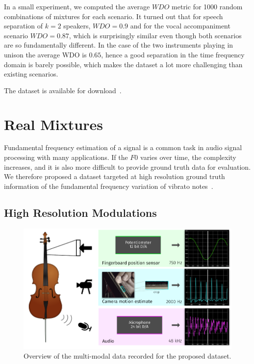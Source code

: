 In a small experiment, we computed the average \(WDO\) metric for 1000 random combinations of mixtures for each scenario.
It turned out that for speech separation of \(k=2\) speakers, \(WDO=0.9\) and for the vocal accompaniment scenario \(WDO=0.87\), which is surprisingly similar even though both scenarios are so fundamentally different.
In the case of the two instruments playing in unison the average WDO is \(0.65\), hence a good separation in the time frequency domain is barely possible, which makes the dataset a lot more challenging than existing scenarios.

The dataset is available for download~\cite{oss_unison}.


\section{Real Mixtures}

Fundamental frequency estimation of a signal is a common task in audio signal processing with many applications. 
If the $F0$ varies over time, the complexity increases, and it is also more difficult to provide ground truth data for evaluation.
We therefore proposed a dataset targeted at high resolution ground truth information of the fundamental frequency variation of vibrato notes~\cite{stoeter15acm}.

\subsection{High Resolution Modulations}


\begin{figure}[h]
  \centering
  \includegraphics[width=\textwidth]{Chapters/04_Data/figures/teaser.pdf}
  \caption{Overview of the multi-modal data recorded for the proposed dataset.}
\label{fig:teaser}
\end{figure}

